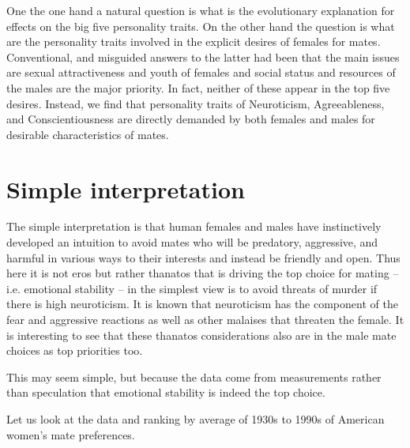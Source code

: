 \documentclass{article}
\begin{document}
One the one hand a natural question is what is the evolutionary explanation for effects on the big five personality traits.  On the other hand the question is what are the personality traits involved in the explicit desires of females for mates.  Conventional, and misguided answers to the latter had been that the main issues are sexual attractiveness and youth of females and social status and resources of the males are the major priority.  In fact, neither of these appear in the top five desires.  Instead, we find that personality traits of Neuroticism, Agreeableness, and Conscientiousness are directly demanded by both females and males for desirable characteristics of mates.  

\section{Simple interpretation}

The simple interpretation is that human females and males have instinctively developed an intuition to avoid mates who will be predatory, aggressive, and harmful in various ways to their interests and instead be friendly and open.  Thus here it is not eros but rather thanatos that is driving the top choice for mating -- i.e. emotional stability -- in the simplest view is to avoid threats of murder if there is high neuroticism.  It is known that neuroticism has the component of the fear and aggressive reactions as well as other malaises that threaten the female.  It is interesting to see that these thanatos considerations also are in the male mate choices as top priorities too.  

This may seem simple, but because the data come from measurements rather than speculation that emotional stability is indeed the top choice.

Let us look at the data and ranking by average of 1930s to 1990s of American women's mate preferences.
\end{document}

